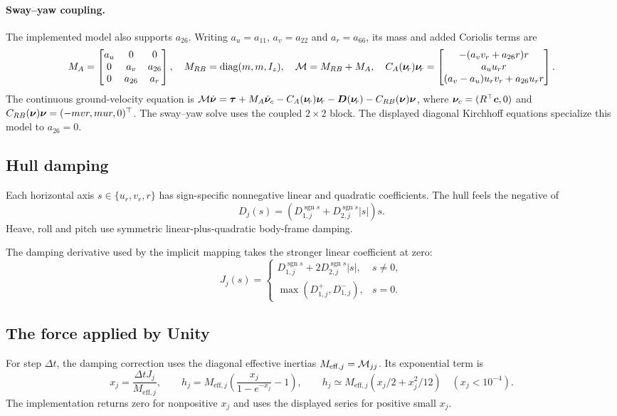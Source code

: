 \paragraph{Sway--yaw coupling.} The implemented model also supports $a_{26}$.
Writing $a_u=a_{11}$, $a_v=a_{22}$ and $a_r=a_{66}$, its mass and added
Coriolis terms are
\[
 M_A=\begin{bmatrix}a_u&0&0\\0&a_v&a_{26}\\0&a_{26}&a_r\end{bmatrix},
 \quad M_{RB}=\operatorname{diag}(m,m,I_z),\quad \mathcal{M}=M_{RB}+M_A,
 \quad C_A(\bm{\nu}_{\!r})\bm{\nu}_{\!r}=\begin{bmatrix}
 -(a_vv_r+a_{26}r)r\\a_uu_rr\\(a_v-a_u)u_rv_r+a_{26}u_rr
 \end{bmatrix}.
\]
The continuous ground-velocity equation is
$\mathcal{M}\dot{\bm{\nu}}=\bm\tau+M_A\dot{\bm{\nu}}_c-C_A(\bm{\nu}_{\!r})\bm{\nu}_{\!r}-\bm D(\bm{\nu}_{\!r})-C_{RB}(\bm{\nu})\bm{\nu}$,
where $\bm{\nu}_c=(R^\top\bm c,0)$ and
$C_{RB}(\bm{\nu})\bm{\nu}=(-mvr,mur,0)^\top$.
The sway--yaw solve uses the coupled $2\times2$ block. The displayed diagonal
Kirchhoff equations specialize this model to $a_{26}=0$.

\subsection{Hull damping}

Each horizontal axis $s\in\{u_r,v_r,r\}$ has sign-specific nonnegative linear
and quadratic coefficients. The hull feels the negative of
\[
 D_j(s)=(D_{1,j}^{\operatorname{sgn}s}+D_{2,j}^{\operatorname{sgn}s}|s|)s.
\]
Heave, roll and pitch use symmetric linear-plus-quadratic body-frame damping.

The damping derivative used by the implicit mapping takes the stronger linear
coefficient at zero:
\[
 J_j(s)=\begin{cases}D_{1,j}^{\operatorname{sgn}s}+2D_{2,j}^{\operatorname{sgn}s}|s|,&s\ne0,\\
 \max(D_{1,j}^+,D_{1,j}^-),&s=0.\end{cases}
\]

\subsection{The force applied by Unity}

For step $\Delta t$, the damping correction uses the diagonal effective inertias
$M_{\mathrm{eff},j}=\mathcal{M}_{jj}$. Its exponential term is
\[
 x_j=\frac{\Delta t J_j}{M_{\mathrm{eff},j}},\qquad
 h_j=M_{\mathrm{eff},j}\left(\frac{x_j}{1-e^{-x_j}}-1\right),
 \qquad h_j\simeq M_{\mathrm{eff},j}(x_j/2+x_j^2/12)\quad(x_j<10^{-4}).
\]
The implementation returns zero for nonpositive $x_j$ and uses the displayed
series for positive small $x_j$.

